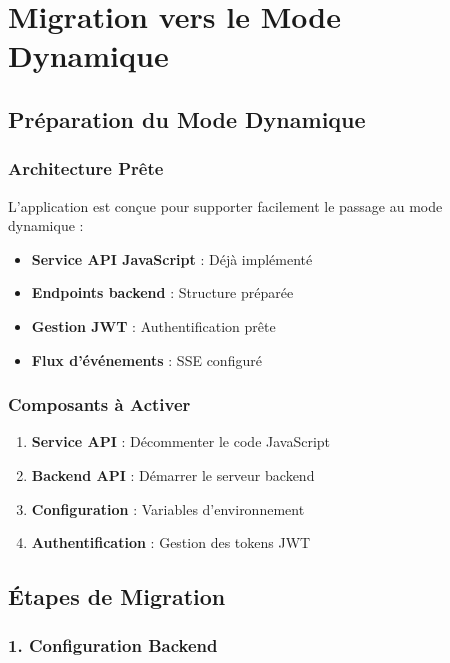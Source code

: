 \documentclass[12pt,a4paper]{report}
\begin{document}
\chapter{Migration vers le Mode Dynamique}

\section{Préparation du Mode Dynamique}

\subsection{Architecture Prête}

L'application est conçue pour supporter facilement le passage au mode dynamique :

\begin{itemize}
    \item \textbf{Service API JavaScript} : Déjà implémenté
    \item \textbf{Endpoints backend} : Structure préparée
    \item \textbf{Gestion JWT} : Authentification prête
    \item \textbf{Flux d'événements} : SSE configuré
\end{itemize}

\subsection{Composants à Activer}

\begin{enumerate}
    \item \textbf{Service API} : Décommenter le code JavaScript
    \item \textbf{Backend API} : Démarrer le serveur backend
    \item \textbf{Configuration} : Variables d'environnement
    \item \textbf{Authentification} : Gestion des tokens JWT
\end{enumerate}

\section{Étapes de Migration}

\subsection{1. Configuration Backend}
\end{document}
